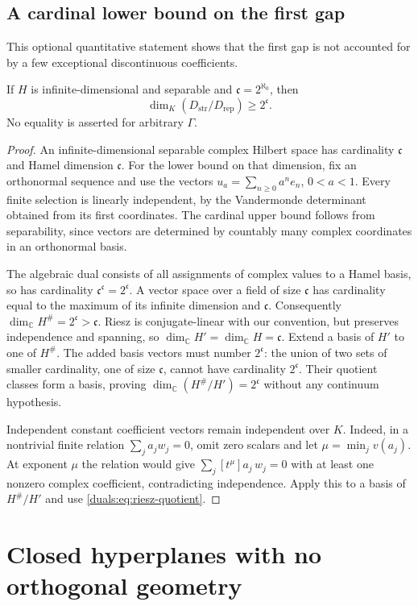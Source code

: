 \documentclass[11pt,letterpaper]{article}
\numberwithin{equation}{section}
\theoremstyle{definition}
\theoremstyle{remark}
\newcommand{\C}{\mathbb C}
\newcommand{\Dstr}{D_{\mathrm{str}}}
\newcommand{\Drep}{D_{\mathrm{rep}}}
\begin{document}
\subsection{A cardinal lower bound on the first gap}
This optional quantitative statement shows that the first gap is not
accounted for by a few exceptional discontinuous coefficients.
\begin{proposition}\label{duals:prop:dimension}
If $H$ is infinite-dimensional and separable and
$\mathfrak c=2^{\aleph_0}$, then
\[
 \dim_K(\Dstr/\Drep)\ge 2^{\mathfrak c}.
\]
No equality is asserted for arbitrary $\Gamma$.
\end{proposition}
\begin{proof}
An infinite-dimensional separable complex Hilbert space has cardinality
$\mathfrak c$ and Hamel dimension $\mathfrak c$.
For the lower bound on that dimension, fix an orthonormal sequence and
use the vectors $u_a=\sum_{n\ge0}a^ne_n$, $0<a<1$.
Every finite selection is linearly independent, by the Vandermonde
determinant obtained from its first coordinates. The cardinal upper
bound follows from separability, since vectors are determined by
countably many complex coordinates in an orthonormal basis.

The algebraic dual consists of all assignments of complex values to a
Hamel basis, so has cardinality
$\mathfrak c^{\mathfrak c}=2^{\mathfrak c}$.
A vector space over a field of size $\mathfrak c$ has cardinality equal
to the maximum of its infinite dimension and $\mathfrak c$.
Consequently $\dim_\C H^\#=2^{\mathfrak c}>\mathfrak c$.
Riesz is conjugate-linear with our convention, but preserves independence
and spanning, so $\dim_\C H'=\dim_\C H=\mathfrak c$.
Extend a basis of $H'$ to one of $H^\#$. The added basis vectors must
number $2^{\mathfrak c}$: the union of two sets of smaller cardinality,
one of size $\mathfrak c$, cannot have cardinality $2^{\mathfrak c}$.
Their quotient classes form a basis, proving
$\dim_\C(H^\#/H')=2^{\mathfrak c}$ without any continuum hypothesis.

Independent constant coefficient vectors remain independent over $K$.
Indeed, in a nontrivial finite relation $\sum_ja_jw_j=0$, omit zero
scalars and let $\mu=\min_jv(a_j)$. At exponent $\mu$ the relation
would give $\sum_j[t^\mu]a_j\,w_j=0$ with at least one nonzero
complex coefficient, contradicting independence. Apply this to a basis
of $H^\#/H'$ and use \eqref{duals:eq:riesz-quotient}.
\end{proof}

\section{Closed hyperplanes with no orthogonal geometry}
\label{duals:sec:hyperplane}
\end{document}
